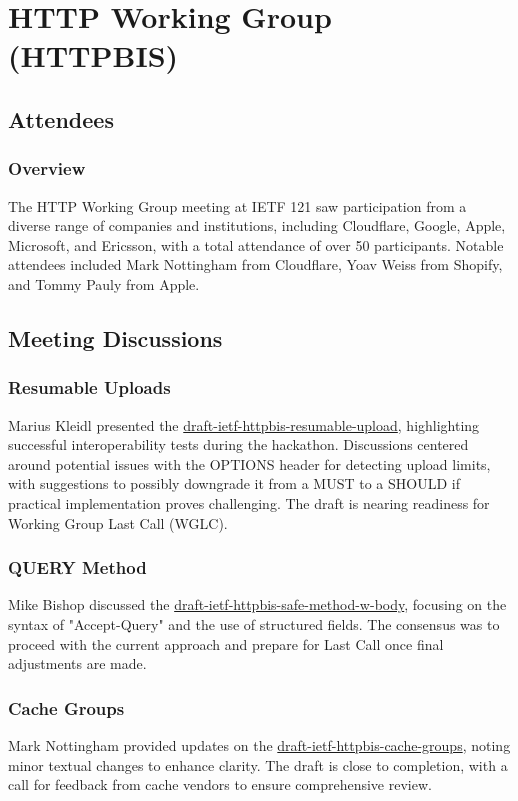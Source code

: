 \documentclass{article}
\begin{document}
\newpage

\section{HTTP Working Group (HTTPBIS)}

\subsection{Attendees}
\subsubsection{Overview}
The HTTP Working Group meeting at IETF 121 saw participation from a diverse range of companies and institutions, including Cloudflare, Google, Apple, Microsoft, and Ericsson, with a total attendance of over 50 participants. Notable attendees included Mark Nottingham from Cloudflare, Yoav Weiss from Shopify, and Tommy Pauly from Apple.

\subsection{Meeting Discussions}

\subsubsection{Resumable Uploads}
Marius Kleidl presented the \href{https://datatracker.ietf.org/doc/html/draft-ietf-httpbis-resumable-upload}{draft-ietf-httpbis-resumable-upload}, highlighting successful interoperability tests during the hackathon. Discussions centered around potential issues with the OPTIONS header for detecting upload limits, with suggestions to possibly downgrade it from a MUST to a SHOULD if practical implementation proves challenging. The draft is nearing readiness for Working Group Last Call (WGLC).

\subsubsection{QUERY Method}
Mike Bishop discussed the \href{https://datatracker.ietf.org/doc/html/draft-ietf-httpbis-safe-method-w-body}{draft-ietf-httpbis-safe-method-w-body}, focusing on the syntax of "Accept-Query" and the use of structured fields. The consensus was to proceed with the current approach and prepare for Last Call once final adjustments are made.

\subsubsection{Cache Groups}
Mark Nottingham provided updates on the \href{https://datatracker.ietf.org/doc/html/draft-ietf-httpbis-cache-groups}{draft-ietf-httpbis-cache-groups}, noting minor textual changes to enhance clarity. The draft is close to completion, with a call for feedback from cache vendors to ensure comprehensive review.
\end{document}
